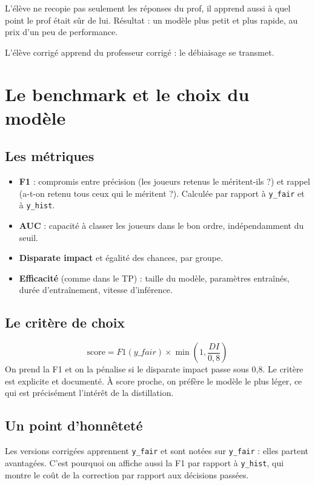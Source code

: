\documentclass[11pt,a4paper]{article}
\begin{document}
\begin{simple}
L'élève ne recopie pas seulement les réponses du prof, il apprend aussi à quel point le prof était sûr de lui. Résultat : un modèle plus petit et plus rapide, au prix d'un peu de performance.
\end{simple}

L'élève corrigé apprend du professeur corrigé : le débiaisage se transmet.

\section{Le benchmark et le choix du modèle}
\subsection{Les métriques}
\begin{itemize}
  \item \textbf{F1} : compromis entre précision (les joueurs retenus le méritent-ils ?) et rappel (a-t-on retenu tous ceux qui le méritent ?). Calculée par rapport à \texttt{y\_fair} et à \texttt{y\_hist}.
  \item \textbf{AUC} : capacité à classer les joueurs dans le bon ordre, indépendamment du seuil.
  \item \textbf{Disparate impact} et égalité des chances, par groupe.
  \item \textbf{Efficacité} (comme dans le TP) : taille du modèle, paramètres entraînés, durée d'entraînement, vitesse d'inférence.
\end{itemize}

\subsection{Le critère de choix}
\[ \text{score} = F1(y\_fair) \times \min\left(1, \frac{DI}{0{,}8}\right) \]
On prend la F1 et on la pénalise si le disparate impact passe sous 0,8. Le critère est explicite et documenté. À score proche, on préfère le modèle le plus léger, ce qui est précisément l'intérêt de la distillation.

\subsection{Un point d'honnêteté}
Les versions corrigées apprennent \texttt{y\_fair} et sont notées sur \texttt{y\_fair} : elles partent avantagées. C'est pourquoi on affiche aussi la F1 par rapport à \texttt{y\_hist}, qui montre le coût de la correction par rapport aux décisions passées.
\end{document}
